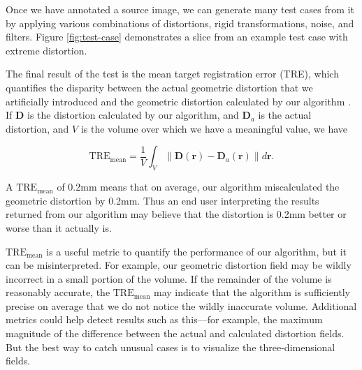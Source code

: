 \documentclass[12pt]{article}
\begin{document}
Once we have annotated a source image, we can generate many test cases from it by applying various combinations of distortions, rigid transformations, noise, and filters.  Figure \ref{fig:test-case} demonstrates a slice from an example test case with extreme distortion.

The final result of the test is the mean target registration error (TRE), which quantifies the disparity between the actual geometric distortion that we artificially introduced and the geometric distortion calculated by our algorithm \cite[page R37]{hill2001}.  If $\textbf{D}$ is the distortion calculated by our algorithm, and $\textbf{D}_a$ is the actual distortion, and $V$ is the volume over which we have a meaningful value, we have

$$
\textrm{TRE}_\textrm{mean} = \frac{1}{V}\int_V \| \textbf{D}(\textbf{r}) - \textbf{D}_a(\textbf{r}) \| d\textbf{r}.
$$

A $\textrm{TRE}_\textrm{mean}$ of 0.2mm means that on average, our algorithm miscalculated the geometric distortion by 0.2mm.  Thus an end user interpreting the results returned from our algorithm may believe that the distortion is 0.2mm better or worse than it actually is.

$\textrm{TRE}_\textrm{mean}$ is a useful metric to quantify the performance of our algorithm, but it can be misinterpreted.  For example, our geometric distortion field may be wildly incorrect in a small portion of the volume.  If the remainder of the volume is reasonably accurate, the $\textrm{TRE}_\textrm{mean}$ may indicate that the algorithm is sufficiently precise on average that we do not notice the wildly inaccurate volume.  Additional metrics could help detect results such as this---for example, the maximum magnitude of the difference between the actual and calculated distortion fields.  But the best way to catch unusual cases is to visualize the three-dimensional fields.
\end{document}
